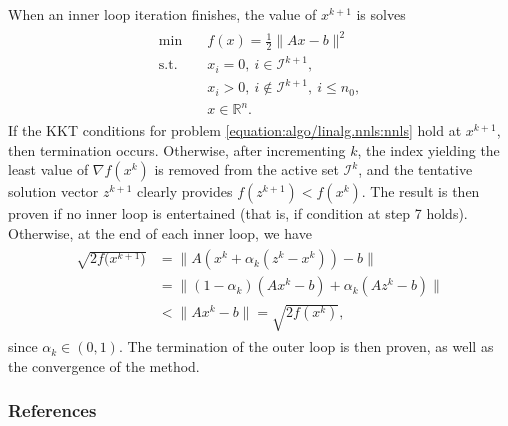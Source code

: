 \documentclass[letterpaper,10pt,english]{sphinxmanual}
\newcommand{\norm}[2][]{#1\lVert#2#1\rVert}
\def\R{\ensuremath{\mathds{R}}}
\begin{document}
\sphinxAtStartPar
When an inner loop iteration finishes, the value of \(x^{k + 1}\) is solves
\begin{equation*}
\begin{split}\begin{array}{ll}
    \min        & \quad f(x) = \frac{1}{2} \norm{Ax - b}^2\\
    \text{s.t.} & \quad x_i = 0, ~ i \in \mathcal{I}^{k + 1},\\
                & \quad x_i > 0, ~ i \notin \mathcal{I}^{k + 1}, ~ i \le n_0,\\
                & \quad x \in \R^n.
\end{array}\end{split}
\end{equation*}
\sphinxAtStartPar
If the KKT conditions for problem \eqref{equation:algo/linalg.nnls:nnls} hold at \(x^{k + 1}\), then
termination occurs. Otherwise, after incrementing \(k\), the index yielding
the least value of \(\nabla f(x^k)\) is removed from the active set
\(\mathcal{I}^k\), and the tentative solution vector \(z^{k + 1}\)
clearly provides \(f(z^{k + 1}) < f(x^k)\). The result is then proven if no
inner loop is entertained (that is, if condition at step 7 holds). Otherwise,
at the end of each inner loop, we have
\begin{equation*}
\begin{split}\begin{aligned}
    \sqrt{2 f\big(x^{k + 1}\big)}
        &= \norm[\big]{A (x^k + \alpha_k (z^k - x^k)) - b}\\
        &= \norm[\big]{(1 - \alpha_k) (Ax^k - b) + \alpha_k (Az^k - b)}\\
        &< \norm{Ax^k - b} = \sqrt{2 f(x^k)},
\end{aligned}\end{split}
\end{equation*}
\sphinxAtStartPar
since \(\alpha_k \in (0, 1)\). The termination of the outer loop is then
proven, as well as the convergence of the method.
\subsubsection*{References}
\end{document}
